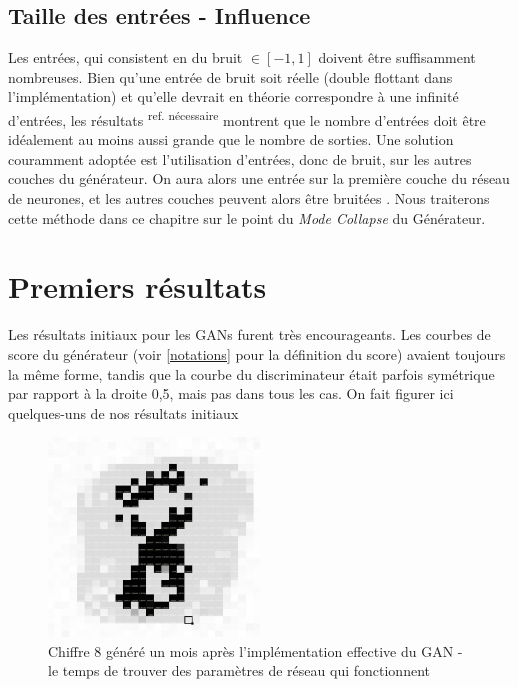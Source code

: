 \subsection{Taille des entrées - Influence}

Les entrées, qui consistent en du bruit $\in [-1,1]$ doivent être suffisamment nombreuses. Bien qu'une entrée de bruit soit réelle (double flottant dans l'implémentation) et qu'elle devrait en théorie correspondre à une infinité d'entrées, les résultats \textsuperscript{ref. nécessaire} montrent que le nombre d'entrées doit être idéalement au moins aussi grande que le nombre de sorties.
Une solution couramment adoptée est l'utilisation d'entrées, donc de bruit, sur les autres couches du générateur. On aura alors une entrée sur la première couche du réseau de neurones, et les autres couches peuvent alors être bruitées \cite{goodfellow_nips_2016}. Nous traiterons cette méthode dans ce chapitre sur le point du \textit{Mode Collapse} du Générateur.

\section{Premiers résultats}

Les résultats initiaux pour les GANs furent très encourageants. Les courbes de score du générateur (voir \ref{notations} pour la définition du score) avaient toujours la même forme, tandis que la courbe du discriminateur était parfois symétrique par rapport à la droite 0,5, mais pas dans tous les cas. On fait figurer ici quelques-uns de nos résultats initiaux
\begin{figure}[ht!]
\begin{center}
\includegraphics[width=0.5\textwidth]{images/18_01_12-GAN/image.png}\caption{Chiffre 8 généré un mois après l'implémentation effective du GAN - le temps de trouver des paramètres de réseau qui fonctionnent}
\end{center}
\end{figure}

